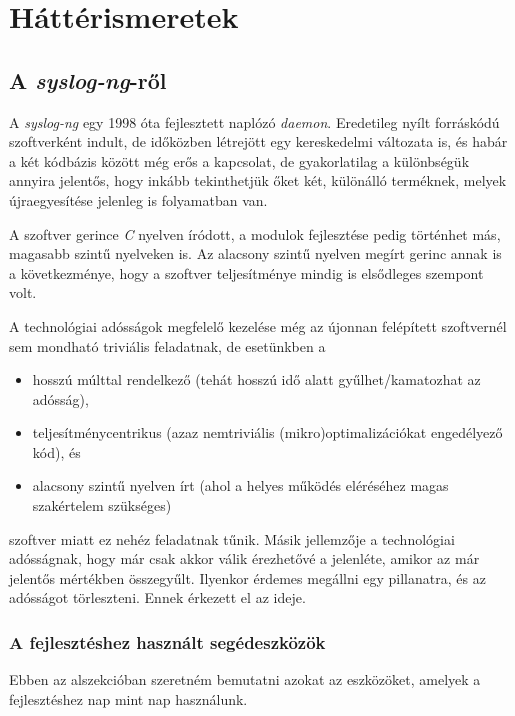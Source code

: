 \chapter{Háttérismeretek}

\section{A \emph{syslog-ng}-ről}

A \emph{syslog-ng} egy 1998 óta fejlesztett naplózó \emph{daemon}. Eredetileg nyílt forráskódú
szoftverként indult, de időközben létrejött egy kereskedelmi változata is, és habár a két kódbázis
között még erős a kapcsolat, de gyakorlatilag a különbségük annyira jelentős, hogy inkább
tekinthetjük őket két, különálló terméknek, melyek újraegyesítése jelenleg is folyamatban van.

A szoftver gerince \emph{C} nyelven íródott, a modulok fejlesztése pedig történhet más, magasabb
szintű nyelveken is. Az alacsony szintű nyelven megírt gerinc annak is a következménye, hogy
a szoftver teljesítménye mindig is elsődleges szempont volt.

A technológiai adósságok megfelelő kezelése még az újonnan felépített szoftvernél sem mondható
triviális feladatnak, de esetünkben a
\begin{itemize}
    \item hosszú múlttal rendelkező (tehát hosszú idő alatt gyűlhet/kamatozhat az adósság),
    \item teljesítménycentrikus (azaz nemtriviális (mikro)optimalizációkat engedélyező kód), és
    \item alacsony szintű nyelven írt (ahol a helyes működés eléréséhez magas szakértelem szükséges)
\end{itemize}
szoftver miatt ez nehéz feladatnak tűnik. Másik jellemzője a technológiai adósságnak, hogy már csak
akkor válik érezhetővé a jelenléte, amikor az már jelentős mértékben összegyűlt.  Ilyenkor érdemes
megállni egy pillanatra, és az adósságot törleszteni. Ennek érkezett el az ideje.

\subsection{A fejlesztéshez használt segédeszközök}

Ebben az alszekcióban szeretném bemutatni azokat az eszközöket, amelyek a fejlesztéshez nap mint nap
használunk.

